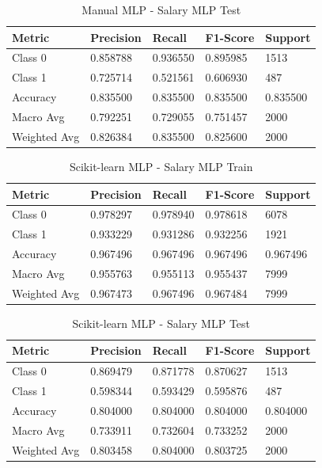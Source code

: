 \documentclass[a4paper,12pt]{article}
\begin{document}
\begin{table}[h!]
    \centering
    \caption{Manual MLP - Salary MLP Test}
    \begin{tabularx}{\textwidth}{|l|X|X|X|X|}
    \hline
    \textbf{Metric} & \textbf{Precision} & \textbf{Recall} & \textbf{F1-Score} & \textbf{Support} \\
    \hline
    Class 0 & 0.858788 & 0.936550 & 0.895985 & 1513 \\
    Class 1 & 0.725714 & 0.521561 & 0.606930 & 487 \\
    Accuracy & 0.835500 & 0.835500 & 0.835500 & 0.835500 \\
    Macro Avg & 0.792251 & 0.729055 & 0.751457 & 2000 \\
    Weighted Avg & 0.826384 & 0.835500 & 0.825600 & 2000 \\
    \hline
    \end{tabularx}
\end{table}

\begin{table}[h!]
    \centering
    \caption{Scikit-learn MLP - Salary MLP Train}
    \begin{tabularx}{\textwidth}{|l|X|X|X|X|}
    \hline
    \textbf{Metric} & \textbf{Precision} & \textbf{Recall} & \textbf{F1-Score} & \textbf{Support} \\
    \hline
    Class 0 & 0.978297 & 0.978940 & 0.978618 & 6078 \\
    Class 1 & 0.933229 & 0.931286 & 0.932256 & 1921 \\
    Accuracy & 0.967496 & 0.967496 & 0.967496 & 0.967496 \\
    Macro Avg & 0.955763 & 0.955113 & 0.955437 & 7999 \\
    Weighted Avg & 0.967473 & 0.967496 & 0.967484 & 7999 \\
    \hline
    \end{tabularx}
\end{table}

\begin{table}[h!]
    \centering
    \caption{Scikit-learn MLP - Salary MLP Test}
    \begin{tabularx}{\textwidth}{|l|X|X|X|X|}
    \hline
    \textbf{Metric} & \textbf{Precision} & \textbf{Recall} & \textbf{F1-Score} & \textbf{Support} \\
    \hline
    Class 0 & 0.869479 & 0.871778 & 0.870627 & 1513 \\
    Class 1 & 0.598344 & 0.593429 & 0.595876 & 487 \\
    Accuracy & 0.804000 & 0.804000 & 0.804000 & 0.804000 \\
    Macro Avg & 0.733911 & 0.732604 & 0.733252 & 2000 \\
    Weighted Avg & 0.803458 & 0.804000 & 0.803725 & 2000 \\
    \hline
    \end{tabularx}
\end{table}
\end{document}
